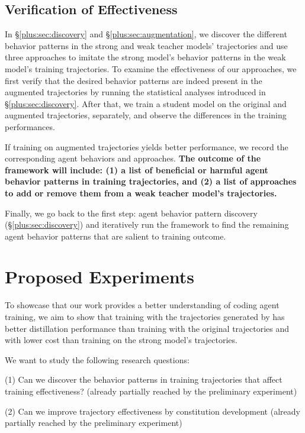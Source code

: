 \subsection{Verification of Effectiveness}
\label{plus:sec:verification}
In \S\ref{plus:sec:discovery} and \S\ref{plus:sec:augmentation}, we discover the different behavior patterns in the strong and weak teacher models' trajectories and use three approaches to imitate the strong model's behavior patterns in the weak model's training trajectories.
To examine the effectiveness of our approaches, we first verify that the desired behavior patterns are indeed present in the augmented trajectories by running the statistical analyses introduced in \S\ref{plus:sec:discovery}.
After that, we train a student model on the original and augmented trajectories, separately, and observe the differences in the training performances.

If training on augmented trajectories yields better performance, we record the corresponding agent behaviors and approaches.
\textbf{The outcome of the \plusname framework will include: (1) a list of beneficial or harmful agent behavior patterns in training trajectories, and (2) a list of approaches to add or remove them from a weak teacher model's trajectories.}

Finally, we go back to the first step: agent behavior pattern discovery (\S\ref{plus:sec:discovery}) and iteratively run the framework to find the remaining agent behavior patterns that are salient to training outcome.






\section{Proposed Experiments}
To showcase that our work provides a better understanding of coding agent training, we aim to show that training with the trajectories generated by \plusname has better distillation performance than training with the original trajectories and with lower cost than training on the strong model's trajectories.



We want to study the following research questions:

(1) Can we discover the behavior patterns in training trajectories that affect training effectiveness? (already partially reached by the preliminary experiment)

(2) Can we improve trajectory effectiveness by constitution development (already partially reached by the preliminary experiment)

